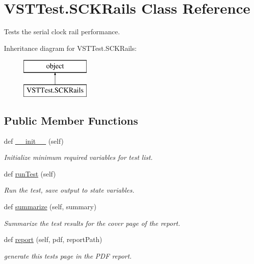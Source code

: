\hypertarget{class_v_s_t_test_1_1_s_c_k_rails}{}\section{V\+S\+T\+Test.\+S\+C\+K\+Rails Class Reference}
\label{class_v_s_t_test_1_1_s_c_k_rails}


Tests the serial clock rail performance.  


Inheritance diagram for V\+S\+T\+Test.\+S\+C\+K\+Rails\+:\begin{figure}[H]
\begin{center}
\leavevmode
\includegraphics[height=2.000000cm]{class_v_s_t_test_1_1_s_c_k_rails}
\end{center}
\end{figure}
\subsection*{Public Member Functions}
\begin{DoxyCompactItemize}
\item 
def \hyperlink{class_v_s_t_test_1_1_s_c_k_rails_a692ae2b1a76088c193733c85b0571e93}{\+\_\+\+\_\+init\+\_\+\+\_\+} (self)
\begin{DoxyCompactList}\small\item\em Initialize minimum required variables for test list. \end{DoxyCompactList}\item 
def \hyperlink{class_v_s_t_test_1_1_s_c_k_rails_a31020db1aefb7c4e0131aef03661418e}{run\+Test} (self)
\begin{DoxyCompactList}\small\item\em Run the test, save output to state variables. \end{DoxyCompactList}\item 
def \hyperlink{class_v_s_t_test_1_1_s_c_k_rails_ac9f5288c99877bfdf5c8740dcda780ce}{summarize} (self, summary)
\begin{DoxyCompactList}\small\item\em Summarize the test results for the cover page of the report. \end{DoxyCompactList}\item 
def \hyperlink{class_v_s_t_test_1_1_s_c_k_rails_a0f3b7316154e4db91db755fd8f20c692}{report} (self, pdf, report\+Path)
\begin{DoxyCompactList}\small\item\em generate this test\textquotesingle{}s page in the P\+DF report. \end{DoxyCompactList}\end{DoxyCompactItemize}


